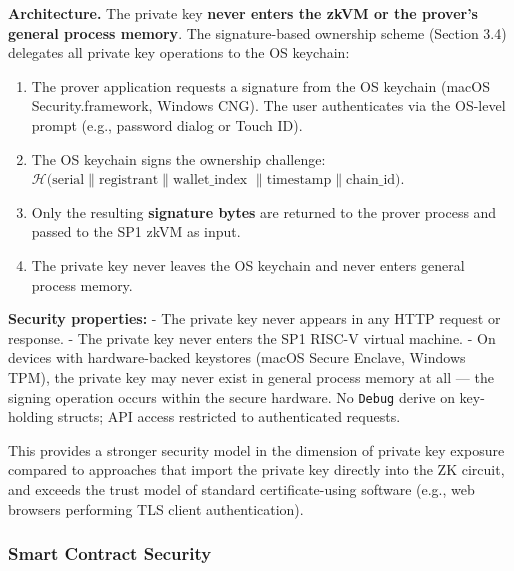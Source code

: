 \documentclass[11pt, a4paper]{article}
\providecommand{\tightlist}{%
  \setlength{\itemsep}{0pt}\setlength{\parskip}{0pt}}
\begin{document}
\textbf{Architecture.} The private key \textbf{never enters the zkVM or
the prover's general process memory}. The signature-based ownership
scheme (Section 3.4) delegates all private key operations to the OS
keychain:

\begin{enumerate}
\def\labelenumi{\arabic{enumi}.}
\tightlist
\item
  The prover application requests a signature from the OS keychain (macOS
  Security.framework, Windows CNG). The user authenticates via the OS-level prompt (e.g., password dialog or Touch ID).
\item
  The OS keychain signs the ownership challenge:
  \(\mathcal{H}(\text{serial} \| \text{registrant} \| \text{wallet\_index}\)
  \(\| \text{timestamp} \| \text{chain\_id})\).
\item
  Only the resulting \textbf{signature bytes} are returned to the prover process and passed to the SP1 zkVM as input.
\item
  The private key never leaves the OS keychain and never enters general process memory.
\end{enumerate}

\textbf{Security properties:} - The private key never appears in any
HTTP request or response. - The private key never enters the SP1 RISC-V
virtual machine. - On devices with hardware-backed keystores (macOS
Secure Enclave, Windows TPM), the private key may never exist in general
process memory at all --- the signing operation occurs within the secure
hardware. No \texttt{Debug} derive on key-holding structs; API access restricted to authenticated requests.

This provides a stronger security model in the dimension of private key
exposure compared to approaches that import the private key directly
into the ZK circuit, and exceeds the trust model of standard
certificate-using software (e.g., web browsers performing TLS client
authentication).

\subsubsection{Smart Contract Security}\label{smart-contract-security}
\end{document}
